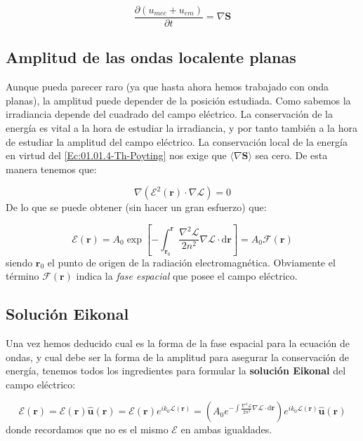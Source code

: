 \documentclass[12pt,a4paper]{book}
\numberwithin{equation}{section}
\numberwithin{figure}{section}
\newcommand{\parentesis}[1]{\left( #1  \right)}
\newcommand{\parciales}[2]{\frac{\partial #1}{\partial #2}}
\newcommand{\ccorchetes}[1]{\left[ #1  \right]}
\newcommand{\D}{\mathrm{d}}
\newcommand{\1}{_{(1)}}
\newcommand{\2}{_{(2)}}
\newcommand{\un}{\mathbf{u}}
\newcommand{\rn}{\mathbf{r}}
\newcommand{\Sn}{\mathbf{S}}
\newcommand{\Encal}{\boldsymbol{\mathcal{E}}}
\newcommand{\hnu}{\hat{\un}}
\theoremstyle{definition}
\begin{document}
\begin{equation}
\parciales{ \parentesis{u_{mec} + u_{em}}}{t} = \nabla \Sn \label{Ec:01.01.4-Th-Poyting}
\end{equation} 


\subsection{Amplitud de las ondas localente planas}

Aunque pueda parecer raro (ya que hasta ahora hemos trabajado con onda planas), la amplitud puede depender de la posición estudiada. Como sabemos la irradiancia depende del cuadrado del campo eléctrico. La conservación de la energía es vital a la hora de estudiar la irradiancia, y por tanto también a la hora de estudiar la amplitud del campo eléctrico. La conservación local de la energía en virtud del \ref{Ec:01.01.4-Th-Poyting} nos exige que $\langle \nabla \Sn \rangle$ sea cero. De esta manera tenemos que:

$$ \nabla (\mathcal{E}^2 (\rn ) \cdot \nabla \mathcal{L}) = 0 $$
De lo que se puede obtener (sin hacer un gran esfuerzo) que:

\begin{equation}
 \mathcal{E} (\rn) = A_0 \exp \ccorchetes{ - \int_{\rn_0}^{\rn} \frac{\nabla^2 \mathcal{L}}{2 n^2}  \nabla \mathcal{L} \cdot \D \rn }  = A_0 \mathcal{F} (\rn)
\end{equation}
siendo $\rn_0$ el punto de origen de la radiación electromagnética. Obviamente el término $\mathcal{F}(\rn)$ indica la \textit{fase espacial} que posee el campo eléctrico.
\subsection{Solución Eikonal}

Una vez hemos deducido cual es la forma de la fase espacial para la ecuación de ondas, y cual debe ser la forma de la amplitud para asegurar la conservación de energía, tenemos todos los ingredientes para formular la \textbf{solución Eikonal} del campo eléctrico:

\begin{equation}
\Encal (\rn) = \mathcal{E} (\rn) \hnu (\rn) = \mathcal{E} (\rn) e^{i k_0 \mathcal{L} (\rn)}  = \parentesis{ A_0 e^{- \int \frac{\nabla^2 \mathcal{L}}{2 n^2} \nabla \mathcal{L} \cdot \D \rn } } e^{i k_0 \mathcal{L} (\rn)} \hnu (\rn)
\end{equation}
donde recordamos que no es  el mismo $\Encal$ en ambas igualdades. 
\end{document}
